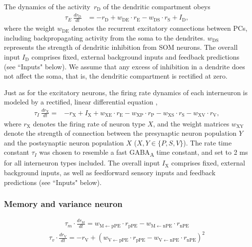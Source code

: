 \documentclass[10pt,a4paper,draft]{article}
\begin{document}
The dynamics of the activity~$r_\mathrm{D}$ of the dendritic compartment obeys \citep{wilson1972excitatory}
%
\begin{align}
\tau_E\ \frac{dr_\mathrm{D}}{dt} &= - r_\mathrm{D} +  w_\mathrm{DE}\cdot r_\mathrm{E}  - w_\mathrm{DS}\cdot r_\mathrm{S} + I_\mathrm{D},
\end{align}
%
where the weight $w_{\mathrm{DE}}$ denotes the recurrent excitatory connections between PCs, including backpropagating activity from the soma to the dendrites. $w_{\mathrm{DS}}$ represents the strength of dendritic inhibition from SOM neurons. The overall input $I_\mathrm{D}$ comprises fixed, external background inputs and feedback predictions (see ``Inputs" below). We assume that any excess of inhibition in a dendrite does not affect the soma, that is, the dendritic compartment is rectified at zero. 

Just as for the excitatory neurons, the firing rate dynamics of each interneuron is modeled by a rectified, linear differential equation \citep{wilson1972excitatory},
%
\begin{align}
\label{eq:RateEqINs}
\tau_I\ \frac{dr_\mathrm{X}}{dt} =& - r_\mathrm{X} + I_{\mathrm{X}} + w_\mathrm{XE}\cdot r_\mathrm{E} - w_\mathrm{XP}\cdot r_\mathrm{P}  - w_\mathrm{XS}\cdot r_\mathrm{S} -  w_\mathrm{XV}\cdot r_\mathrm{V}, 
\end{align}
%
where $r_\mathrm{X}$ denotes the firing rate of neuron type $X$, and the weight matrices $w_\mathrm{XY}$ denote the strength of connection between the presynaptic neuron population $Y$ and the postsynaptic neuron population $X$ ($X, Y\in \lbrace P,S,V\rbrace$). The rate time constant $\tau_I$ was chosen to resemble a fast GABA\textsubscript{A} time constant, and set to 2 ms for all interneuron types included. The overall input $I_\mathrm{X}$ comprises fixed, external background inputs, as well as feedforward sensory inputs and feedback predictions (see ``Inputs" below).

\subsubsection*{Memory and variance neuron}
%
\begin{align}
\tau_m \cdot \frac{dr_\mathrm{M}}{dt} = w_\mathrm{M\leftarrow pPE} \cdot r_\mathrm{pPE} - w_\mathrm{M\leftarrow nPE} \cdot r_\mathrm{nPE} 
\end{align}
%
\begin{align}
\tau_v \cdot \frac{dr_\mathrm{V}}{dt} = -r_\mathrm{V} + (w_\mathrm{V\leftarrow pPE} \cdot r_\mathrm{pPE} - w_\mathrm{V\leftarrow nPE} \cdot r_\mathrm{nPE})^2 
\end{align}
\end{document}
